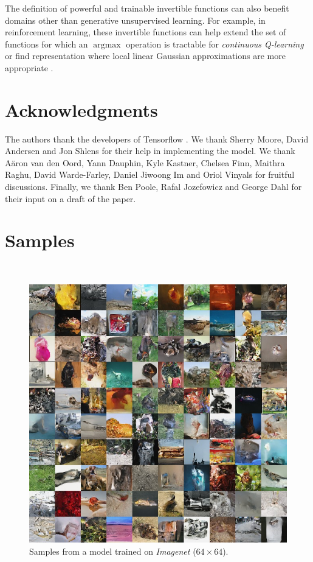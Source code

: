 \documentclass{article}
\DeclareMathOperator*{\argmax}{argmax}
\begin{document}
The definition of powerful and trainable invertible functions can also benefit domains other than generative unsupervised learning. For example, in reinforcement learning, these invertible functions can help extend the set of functions for which an $\argmax$ operation is tractable for {\em continuous Q-learning} \citep{gu2016continuous} or find representation where local linear Gaussian approximations are more appropriate \citep{watter2015embed}.


\section{Acknowledgments}
The authors thank the developers of Tensorflow \citep{abadi2016tensorflow}.
We thank Sherry Moore, David Andersen and Jon Shlens for their help in implementing the model.
We thank Aäron van den Oord, Yann Dauphin, Kyle Kastner, Chelsea Finn, Maithra Raghu, David Warde-Farley, Daniel Jiwoong Im and Oriol Vinyals for fruitful discussions.
Finally, we thank Ben Poole, Rafal Jozefowicz and George Dahl for their input on a draft of the paper.

\small
\setlength{\bibsep}{0pt plus 0.12ex}
% 



\iftrue
\newpage
\appendix
\section{Samples}
~ \\

\begin{figure}[H]
    \centering \includegraphics[width=1.\textwidth]{imnet_samples.jpg}
    \caption{Samples from a model trained on \emph{Imagenet} ($64 \times 64$).}
\vspace{120pt}
\end{figure}
\end{document}
